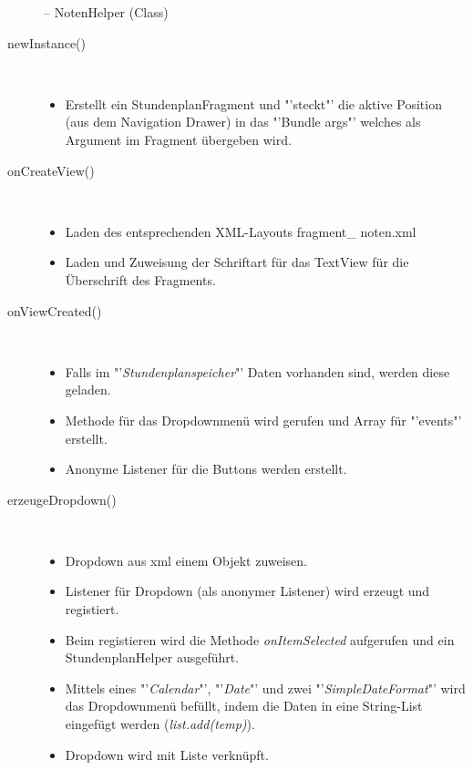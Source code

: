 \begin{description}
-- NotenHelper (Class)

\newpage


\item[newInstance()]~\par
\begin{itemize}
\item Erstellt ein StundenplanFragment und "'steckt"' die aktive Position (aus dem Navigation Drawer) in das "'Bundle args"' welches als Argument im Fragment übergeben wird.
\end{itemize} 
\item[onCreateView()]~\par
\begin{itemize}
\item Laden des entsprechenden XML-Layouts fragment\_ noten.xml
\item Laden und Zuweisung der Schriftart für das TextView für die Überschrift des Fragments.
\end{itemize}

\item[onViewCreated()]~\par
\begin{itemize}
\item Falls im "'\textit{Stundenplanspeicher}"' Daten vorhanden sind, werden diese geladen.
\item Methode für das Dropdownmenü wird gerufen und Array für "'events"' erstellt.
\item Anonyme Listener für die Buttons werden erstellt.
\end{itemize}

\item[erzeugeDropdown()]~\par
\begin{itemize}
\item Dropdown aus xml einem Objekt zuweisen.
\item Listener für Dropdown (als anonymer Listener) wird erzeugt und registiert.
\item Beim registieren wird die Methode \textit{onItemSelected} aufgerufen und ein StundenplanHelper ausgeführt.
\item Mittels eines "'\textit{Calendar}"', "'\textit{Date}"' und zwei "'\textit{SimpleDateFormat}"' wird das Dropdownmenü befüllt, indem die Daten in eine String-List eingefügt werden (\textit{list.add(temp)}).
\item Dropdown wird mit Liste verknüpft.
\end{itemize}
 

\end{description}
